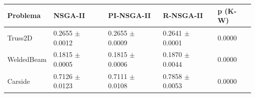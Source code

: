 \begin{tabular}{lllll}
\toprule
Problema & NSGA-II & PI-NSGA-II & R-NSGA-II & p (K-W) \\
\midrule
Truss2D & 0.2655 $\pm$ 0.0012 & 0.2655 $\pm$ 0.0009 & 0.2641 $\pm$ 0.0001 & 0.0000 \\
WeldedBeam & 0.1815 $\pm$ 0.0005 & 0.1815 $\pm$ 0.0006 & 0.1870 $\pm$ 0.0044 & 0.0000 \\
Carside & 0.7126 $\pm$ 0.0123 & 0.7111 $\pm$ 0.0108 & 0.7858 $\pm$ 0.0053 & 0.0000 \\
\bottomrule
\end{tabular}
